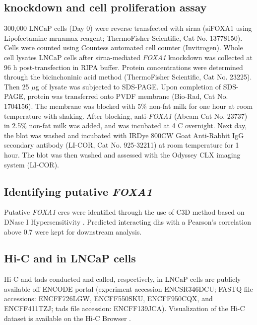 \subsection{ knockdown and cell proliferation assay}

300,000 LNCaP cells (Day 0) were reverse transfected with \gls{sirna} (siFOXA1 using Lipofectamine \gls{mrna}max reagent; ThermoFisher Scientific, Cat No. 13778150).
Cells were counted using Countess automated cell counter (Invitrogen).
Whole cell lysates LNCaP cells after \gls{sirna}-mediated \emph{FOXA1} knockdown was collected at 96 h post-transfection in RIPA buffer.
Protein concentrations were determined through the bicinchoninic acid method (ThermoFisher Scientific, Cat No. 23225).
Then 25 $\mu$g of lysate was subjected to SDS-PAGE.
Upon completion of SDS-PAGE, protein was transferred onto PVDF membrane (Bio-Rad, Cat No. 1704156).
The membrane was blocked with 5\% non-fat milk for one hour at room temperature with shaking.
After blocking, anti-\emph{FOXA1} (Abcam Cat No. 23737) in 2.5\% non-fat milk was added, and was incubated at 4 \textdegree C overnight.
Next day, the blot was washed and incubated with IRDye 800CW Goat Anti-Rabbit IgG secondary antibody (LI-COR, Cat No. 925-32211) at room temperature for 1 hour.
The blot was then washed and assessed with the Odyssey CLX imaging system (LI-COR).

\subsection{Identifying putative \emph{FOXA1} }

Putative \emph{FOXA1} \glspl{cre} were identified through the use of C3D method based on DNase I Hypersensitivity \cite{mehdiC3DToolPredict2019}.
Predicted interacting \gls{dhs} with a Pearson's correlation above 0.7 \cite{thurmanAccessibleChromatinLandscape2012} were kept for downstream analysis.

\subsection{Hi-C and  in LNCaP cells}

Hi-C and \glspl{tad} conducted and called, respectively, in LNCaP cells are publicly available off ENCODE portal (experiment accession ENCSR346DCU; FASTQ file accessions: ENCFF726LGW, ENCFF550SKU, ENCFF950CQX, and ENCFF411TZJ; \glspl{tad} file accession: ENCFF139JCA).
Visualization of the Hi-C dataset is available on the Hi-C Browser \cite{wang3DGenomeBrowser2018}.

